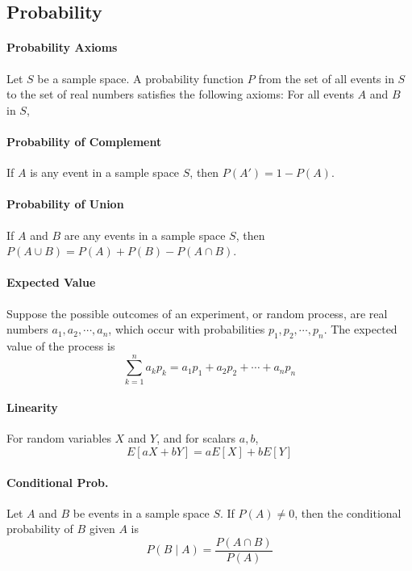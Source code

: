 \documentclass[a4paper]{article}
\begin{document}
\begin{multicols*}{3}
    \subsection*{Probability}
      \paragraph{Probability Axioms} Let $S$ be a sample space. A probability function $P$ from the set of all events in $S$ to the set of real numbers satisfies the following axioms: For all events $A$ and $B$ in $S$,
      \paragraph{Probability of Complement} If $A$ is any event in a sample space $S$, then $P(A') = 1 - P(A)$.
      \paragraph{Probability of Union} If $A$ and $B$ are any events in a sample space $S$, then $P(A \cup B) = P(A) + P(B) - P(A \cap B)$.
      \paragraph{Expected Value} Suppose the possible outcomes of an experiment, or random process, are real numbers $a_1, a_2, \cdots, a_n$, which occur with probabilities $p_1, p_2, \cdots, p_n$. The expected value of the process is
        \begin{equation*}
          \sum_{k=1}^n a_k p_k = a_1 p_1 + a_2 p_2 + \cdots + a_n p_n
        \end{equation*}
      \paragraph{Linearity} For random variables $X$ and $Y$, and for scalars $a,b$,
        \begin{equation*}
          E[aX+bY] = aE[X] + bE[Y]
        \end{equation*}
      \paragraph{Conditional Prob.} Let $A$ and $B$ be events in a sample space $S$. If $P(A) \neq 0$, then the conditional probability of $B$ given $A$ is
        \begin{equation*}
          P(B \;\vert\; A) = \dfrac{P(A \cap B)}{P(A)}
        \end{equation*}

\end{multicols*}
\end{document}
